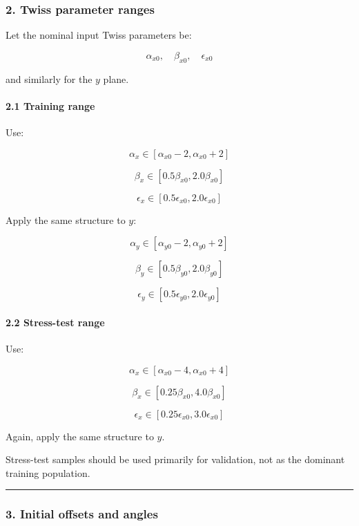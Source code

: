 \documentclass[
]{article}
\begin{document}
\hypertarget{twiss-parameter-ranges}{%
\subsubsection{2. Twiss parameter ranges}\label{twiss-parameter-ranges}}

Let the nominal input Twiss parameters be:

\[
\alpha_{x0},\quad \beta_{x0},\quad \epsilon_{x0}
\]

and similarly for the \(y\) plane.

\hypertarget{training-range}{%
\paragraph{2.1 Training range}\label{training-range}}

Use:

\[
\alpha_x \in [\alpha_{x0}-2,\alpha_{x0}+2]
\]

\[
\beta_x \in [0.5\beta_{x0},2.0\beta_{x0}]
\]

\[
\epsilon_x \in [0.5\epsilon_{x0},2.0\epsilon_{x0}]
\]

Apply the same structure to \(y\):

\[
\alpha_y \in [\alpha_{y0}-2,\alpha_{y0}+2]
\]

\[
\beta_y \in [0.5\beta_{y0},2.0\beta_{y0}]
\]

\[
\epsilon_y \in [0.5\epsilon_{y0},2.0\epsilon_{y0}]
\]

\hypertarget{stress-test-range}{%
\paragraph{2.2 Stress-test range}\label{stress-test-range}}

Use:

\[
\alpha_x \in [\alpha_{x0}-4,\alpha_{x0}+4]
\]

\[
\beta_x \in [0.25\beta_{x0},4.0\beta_{x0}]
\]

\[
\epsilon_x \in [0.25\epsilon_{x0},3.0\epsilon_{x0}]
\]

Again, apply the same structure to \(y\).

Stress-test samples should be used primarily for validation, not as the
dominant training population.

\begin{center}\rule{0.5\linewidth}{0.5pt}\end{center}

\hypertarget{initial-offsets-and-angles}{%
\subsubsection{3. Initial offsets and
angles}\label{initial-offsets-and-angles}}
\end{document}
